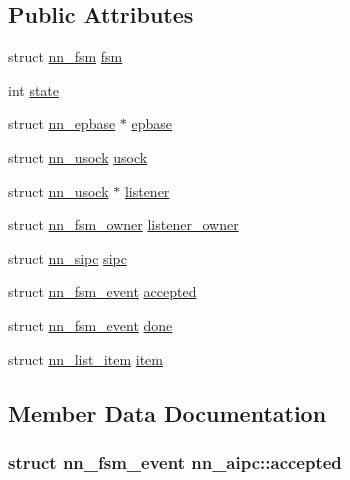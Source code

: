 \subsection*{Public Attributes}
\begin{DoxyCompactItemize}
\item 
struct \hyperlink{structnn__fsm}{nn\+\_\+fsm} \hyperlink{structnn__aipc_af9e3aa7a9621f8dd9fbfe0b862dcdc89}{fsm}
\item 
int \hyperlink{structnn__aipc_a3aa1ceafa1bf2916f05b26bee723762d}{state}
\item 
struct \hyperlink{structnn__epbase}{nn\+\_\+epbase} $\ast$ \hyperlink{structnn__aipc_a25f1490e7a0246887156d2fbd12a2b80}{epbase}
\item 
struct \hyperlink{structnn__usock}{nn\+\_\+usock} \hyperlink{structnn__aipc_a9d3cd8149c6dac1c9f7987fd55325dcd}{usock}
\item 
struct \hyperlink{structnn__usock}{nn\+\_\+usock} $\ast$ \hyperlink{structnn__aipc_a008ab3a69a055c4744d6ee21042918ae}{listener}
\item 
struct \hyperlink{structnn__fsm__owner}{nn\+\_\+fsm\+\_\+owner} \hyperlink{structnn__aipc_a5a59d11eb014b4f1eb7982d762f0e524}{listener\+\_\+owner}
\item 
struct \hyperlink{structnn__sipc}{nn\+\_\+sipc} \hyperlink{structnn__aipc_a8fd7cacc4fd9dd917bb28b5531bea6d1}{sipc}
\item 
struct \hyperlink{structnn__fsm__event}{nn\+\_\+fsm\+\_\+event} \hyperlink{structnn__aipc_ad6656f52dbfb61b575abf726b4a04e53}{accepted}
\item 
struct \hyperlink{structnn__fsm__event}{nn\+\_\+fsm\+\_\+event} \hyperlink{structnn__aipc_ae4f441d4718a9fc65b30165f36ab28ac}{done}
\item 
struct \hyperlink{structnn__list__item}{nn\+\_\+list\+\_\+item} \hyperlink{structnn__aipc_aa406a6c84762843d34f8db2c0975f3cd}{item}
\end{DoxyCompactItemize}


\subsection{Member Data Documentation}
\subsubsection[{accepted}]{\setlength{\rightskip}{0pt plus 5cm}struct {\bf nn\+\_\+fsm\+\_\+event} nn\+\_\+aipc\+::accepted}\hypertarget{structnn__aipc_ad6656f52dbfb61b575abf726b4a04e53}{}\label{structnn__aipc_ad6656f52dbfb61b575abf726b4a04e53}
